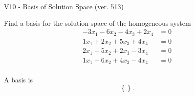\begin{exercise}
  \begin{exerciseTitle}V10 - Basis of Solution Space (ver. 513)\end{exerciseTitle}
  \begin{exerciseStatement}
    Find a basis for the solution space of the homogeneous system 
\begin{align*}
 -3 x_ 1 -6 x_ 2 -4 x_ 3 + 2 x_ 4 &= 0  \\ 
  1 x_ 1 + 2 x_ 2 + 5 x_ 3 + 4 x_ 4 &= 0  \\ 
  2 x_ 1 -5 x_ 2 + 2 x_ 3 -3 x_ 4 &= 0  \\ 
  1 x_ 1 -6 x_ 2 + 4 x_ 3 -4 x_ 4 &= 0  \\ 
 \end{align*}


 
  \end{exerciseStatement}

  \begin{exerciseAnswer}
   A basis is   
\[\left\{\right\}.\]

  


  \end{exerciseAnswer}
\end{exercise}